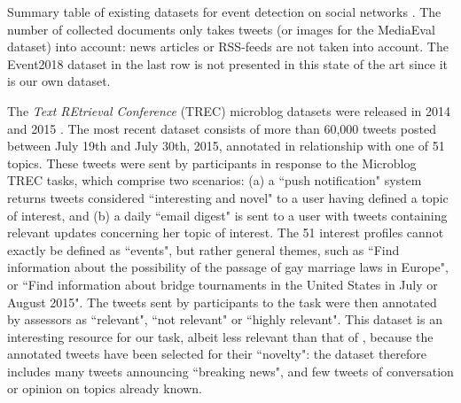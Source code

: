 \begin{table}
\begin{center}
\end{center}
\caption[Summary table of existing datasets for event detection on social networks]{Summary table of existing datasets for event detection on social networks \label{Tab:datasets}. The number of collected documents only takes tweets (or images for the MediaEval dataset) into account: news articles or RSS-feeds are not taken into account. The Event2018 dataset in the last row is not presented in this state of the art since it is our own dataset.}
\end{table}

The \textit{Text REtrieval Conference} (TREC) microblog datasets were released in 2014 \cite{lin2014overview} and 2015 \cite{lin2015overview}. The most recent dataset consists of more than 60,000 tweets posted between July 19th and July 30th, 2015, annotated in relationship with one of 51 topics. These tweets were sent by participants in response to the Microblog TREC tasks, which comprise two scenarios: (a) a ``push notification" system returns tweets considered ``interesting and novel" to a user having defined a topic of interest, and (b) a daily ``email digest" is sent to a user with tweets containing relevant updates concerning her topic of interest. The 51 interest profiles cannot exactly be defined as ``events", but rather general themes, such as ``Find information about the possibility of the passage of gay marriage laws in Europe", or ``Find information about bridge tournaments in the United States in July or August 2015". The tweets sent by participants to the task were then annotated by assessors as ``relevant", ``not relevant" or ``highly relevant". This dataset is an interesting resource for our task, albeit less relevant than that of \citet{mcminn_building_2013}, because the annotated tweets have been selected for their ``novelty": the dataset therefore includes many tweets announcing ``breaking news", and few tweets of conversation or opinion on topics already known.

